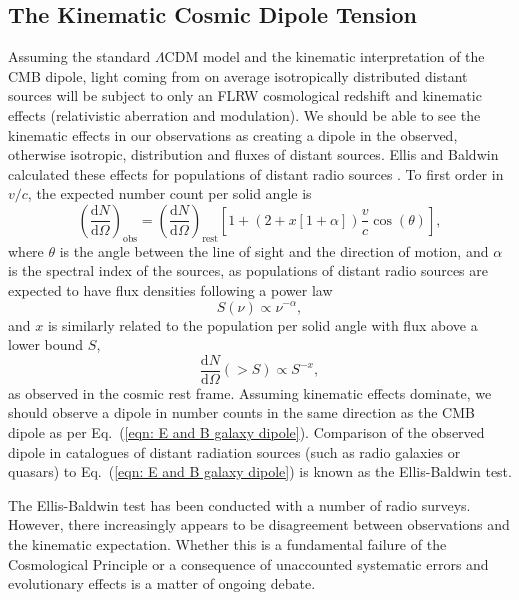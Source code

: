 \documentclass[a4paper,12pt]{report}
\newcommand{\deriv}[2]{\frac{\text{d}{#1}}{\text{d}{#2}}}
\renewcommand{\eqref}[1]{Eq.~({#1})}
\begin{document}
\subsection{The Kinematic Cosmic Dipole Tension}\label{section: kinematic cosmic dipole tension}
Assuming the standard $\Lambda$CDM model and the kinematic interpretation of the CMB dipole, light coming from on average isotropically distributed distant sources will be subject to only an FLRW cosmological redshift and kinematic effects (relativistic aberration and modulation). We should be able to see the kinematic effects in our observations as creating a dipole in the observed, otherwise isotropic, distribution and fluxes of distant sources. Ellis and Baldwin calculated these effects for populations of distant radio sources \cite{RN67}. To first order in $v/c$, the expected number count per solid angle is
\begin{equation}\label{eqn: E and B galaxy dipole}
  \left(\deriv{N}{\Omega}\right)_{\text{obs}} = \left(\deriv{N}{\Omega}\right)_{\text{rest}}
  \left[1+\left(2+x\left[1+\alpha\right]\right)\frac{v}{c}\cos(\theta)\right],
\end{equation}
where $\theta$ is the angle between the line of sight and the direction of motion, and $\alpha$ is the spectral index of the sources, as populations of distant radio sources are expected to have flux densities following a power law
\begin{equation}
  S(\nu) \propto \nu^{-\alpha},
\end{equation}
and $x$ is similarly related to the population per solid angle with flux above a lower bound $S$,
\begin{equation}
  \deriv{N}{\Omega}(>S) \propto S^{-x},
\end{equation}
as observed in the cosmic rest frame. Assuming kinematic effects dominate, we should observe a dipole in number counts in the same direction as the CMB dipole as per \eqref{\ref{eqn: E and B galaxy dipole}}. Comparison of the observed dipole in catalogues of distant radiation sources (such as radio galaxies or quasars) to \eqref{\ref{eqn: E and B galaxy dipole}} is known as the Ellis-Baldwin test.

The Ellis-Baldwin test has been conducted with a number of radio surveys. However, there increasingly appears to be disagreement between observations and the kinematic expectation. Whether this is a fundamental failure of the Cosmological Principle or a consequence of unaccounted systematic errors and evolutionary effects is a matter of ongoing debate.
\end{document}

